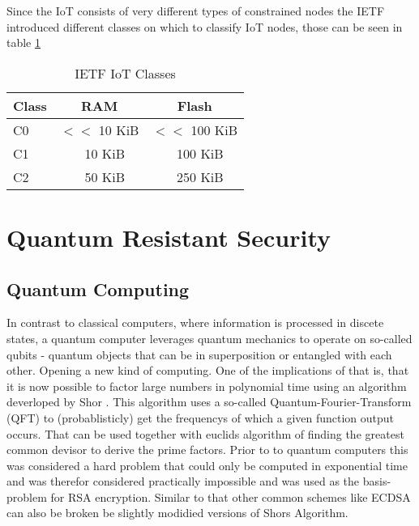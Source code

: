 \documentclass[conference]{IEEEtran}
\begin{document}
Since the IoT consists of very different types of constrained nodes the IETF introduced different classes on which to classify IoT nodes, those can be seen in table \ref{IoT-classes}

\begin{table}
    \label{IoT-classes}
    \caption{IETF IoT Classes}
    \begin{tabular}{l | c c}
        Class & RAM & Flash \\
        \hline
        C0 & $<<$ 10 KiB & $<<$ 100 KiB\\
        C1 & ~ 10 KiB & ~ 100 KiB\\
        C2 & ~ 50 KiB & ~ 250 KiB\\
    \end{tabular} 
\end{table}



\section{Quantum Resistant Security}
\subsection{Quantum Computing}\label{l:quantum_computing}
In contrast to classical computers, where information is processed in discete states, a quantum computer leverages quantum mechanics to operate on so-called qubits - quantum objects that can be in superposition or entangled with each other. 
Opening a new kind of computing. 
One of the implications of that is, that it is now possible to factor large numbers in polynomial time using an algorithm deverloped by Shor \cite{Shor}. 
This algorithm uses a so-called Quantum-Fourier-Transform (QFT) to (probablisticly) get the frequencys of which a given function output occurs. That can be used together with euclids algorithm of finding the greatest common devisor to derive the prime factors. 
Prior to to quantum computers this was considered a hard problem that could only be computed in exponential time and was therefor considered practically impossible and was used as the basis-problem for RSA encryption.
Similar to that other common schemes like ECDSA can also be broken be slightly modidied versions of Shors Algorithm.
\end{document}
